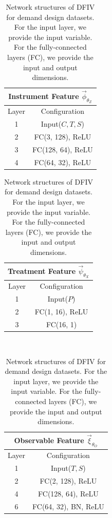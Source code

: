 \begingroup
\renewcommand{\arraystretch}{1.2}
\begin{table}[t]
    \caption{Network structures of DFIV for demand design datasets. For the input layer, we provide the input variable. For the fully-connected layers (FC), we provide the input and output dimensions.}
    
    \label{dfiv-demand-network}
    
    \begin{minipage}{0.48\hsize}
        \centering
        \begin{tabular}{cc}
            \multicolumn{2}{c}{\textbf{Instrument Feature} $\vec{\phi}_{\theta_Z}$ }
            \\ \hline
            Layer & Configuration \\ \hline
            1 & Input($C, T, S$) \\ \hline
            2 & FC(3, 128), ReLU \\ \hline
            3 & FC(128, 64), ReLU \\ \hline
            4 & FC(64, 32), ReLU \\ \hline
            \end{tabular}    
    \end{minipage}
    \hfill
    \begin{minipage}{0.48\hsize}
        \centering
        \begin{tabular}{cc}
            \multicolumn{2}{c}{\textbf{Treatment Feature} $\vec{\psi}_{\theta_X}$} 
            \\ \hline
            Layer & Configuration \\ \hline
            1 & Input($P$) \\ \hline
            2 & FC(1, 16), ReLU \\ \hline
            3 & FC(16, 1) \\ \hline
            \end{tabular}    
    \end{minipage}\\
    \centering
    
    \begin{minipage}{0.48\hsize}
        \centering
        \begin{tabular}{cc}
            \multicolumn{2}{c}{\textbf{Observable Feature} $\vec{\xi}_{\theta_O}$} 
            \\ \hline
            Layer & Configuration \\ \hline
            1 & Input($T, S$) \\ \hline
            2 & FC(2, 128), ReLU \\ \hline
            4 & FC(128, 64), ReLU \\ \hline
            6 & FC(64, 32), BN, ReLU \\ \hline
            \end{tabular}    
    \end{minipage}
\end{table}
\endgroup  

